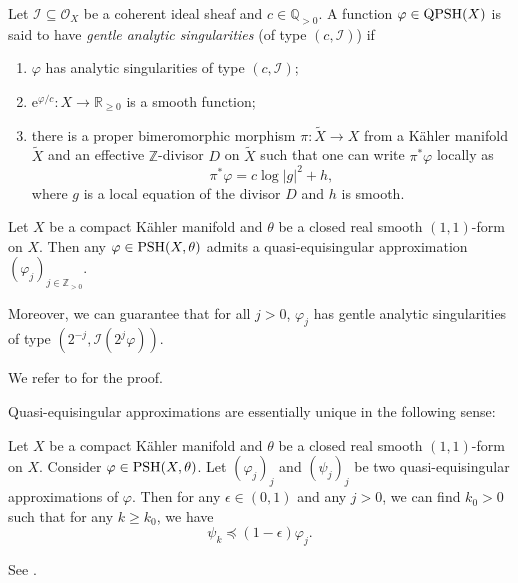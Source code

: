 \begin{definition}\label{def:analy-sing}
    Let $\mathcal{I}\subseteq\mathcal O_X$ be a coherent ideal sheaf and $c\in\mathbb{Q}_{>0}$. A function $\varphi\in \mathrm{QPSH}(X)$ is said to have \emph{gentle analytic singularities}  (of type $(c,\mathcal{I})$) if
\begin{enumerate}
    \item\label{itm:def:analy-sing:1} $\varphi$ has analytic singularities of type $(c,\mathcal{I})$;
    \item\label{itm:def:analy-sing:2} $\mathrm{e}^{{\varphi}/{c}}\colon X\to \mathbb{R}_{\geq 0}$ is a smooth function;
    \item\label{itm:def:analy-sing:3} there is a proper bimeromorphic morphism $\pi\colon \widetilde{X}\to X$ from a Kähler manifold $\widetilde{X}$ and an effective $\mathbb{Z}$-divisor $D$ on $\widetilde{X}$ such that one can write $\pi^*\varphi$ locally as
    \[
        \pi^*\varphi=c\log|g|^2+h,
    \]
    where $g$ is a local equation of the divisor $D$ and $h$ is smooth.
\end{enumerate}
\end{definition}

\begin{theorem}\label{thm:qequi}
    Let $X$ be a compact Kähler manifold and $\theta$ be a closed real smooth $(1,1)$-form on $X$. Then any $\varphi\in \mathrm{PSH}(X,\theta)$ admits a quasi-equisingular approximation $(\varphi_j)_{j\in \mathbb{Z}_{>0}}$.

    Moreover, we can guarantee that for all $j>0$, $\varphi_j$ has gentle analytic singularities of type $\left(2^{-j},\mathcal{I}(2^j\varphi)\right)$.
\end{theorem}
We refer to \cite{Dem92reg, DPS01} for the proof.

Quasi-equisingular approximations are essentially unique in the following sense:
\begin{proposition}\label{prop:compqequi}
    Let $X$ be a compact Kähler manifold and $\theta$ be a closed real smooth $(1,1)$-form on $X$. Consider $\varphi\in \mathrm{PSH}(X,\theta)$. Let $(\varphi_j)_j$ and $(\psi_j)_j$ be two quasi-equisingular approximations of $\varphi$. Then for any $\epsilon\in (0,1)$ and any $j>0$, we can find $k_0>0$ such that for any $k\geq k_0$, we have
    \[
        \psi_k\preceq (1-\epsilon)\varphi_j.
    \]
\end{proposition}
See \cite[Corollary~4.1.7]{Dem15}.


